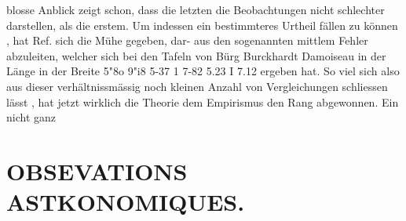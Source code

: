 \documentclass[12pt,a4paper]{article}
\begin{document}
{{{{{{{{blosse  Anblick  zeigt  schon,  dass  die  letzten  die  Beobachtungen  nicht  schlechter  darstellen,  als  die erstem.  Um  indessen  ein  bestimmteres  Urtheil  fällen  zu  können ,  hat  Ref.  sich  die  Mühe  gegeben,  dar- aus den  sogenannten  mittlem  Fehler  abzuleiten,  welcher  sich bei  den  Tafeln  von Bürg Burckhardt Damoiseau in  der  Länge in  der  Breite 5"8o  9"i8 5-37  1         7-82 5.23  I  7.12 ergeben  hat.     So  viel  sich  also  aus  dieser  verhältnissmässig   noch   kleinen   Anzahl   von   Vergleichungen schliessen  lässt ,  hat  jetzt  wirklich  die  Theorie  dem  Empirismus  den  Rang  abgewonnen.     Ein  nicht  ganz


\section*{OBSEVATIONS  ASTKONOMIQUES.}

}}}}}}}}
\end{document}
